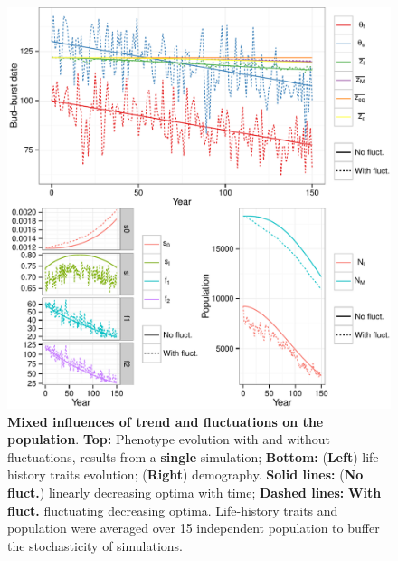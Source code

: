 \begin{figure}[ht!]
	\centering
	\includegraphics[scale=1]{Figures/Trend.pdf}
	\caption{\textbf{Mixed influences of trend and fluctuations on the population}. \textbf{Top:} Phenotype evolution with and without fluctuations, results from a \textbf{single} simulation; \textbf{Bottom:} (\textbf{Left}) life-history traits evolution; (\textbf{Right}) demography. \textbf{Solid lines:} (\textbf{No fluct.}) linearly decreasing optima with time; \textbf{Dashed lines:} \textbf{With fluct.} fluctuating decreasing optima. Life-history traits and population were averaged over 15 independent population to buffer the stochasticity of simulations.}
	\label{fig:trend}
\end{figure}

